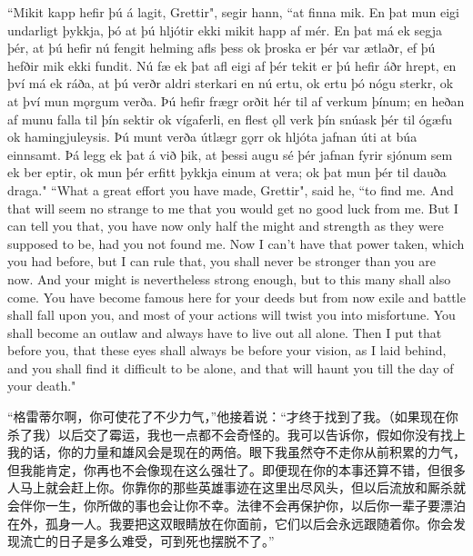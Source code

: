 \begin{paracol}{2}
  ``Mikit kapp hefir þú á lagit, Grettir", segir hann, ``at finna mik. En þat mun eigi undarligt þykkja, þó at þú hljótir ekki mikit happ af mér. En þat má ek segja þér, at þú hefir nú fengit helming afls þess ok þroska er þér var ætlaðr, ef þú hefðir mik ekki fundit. Nú fæ ek þat afl eigi af þér tekit er þú hefir áðr hrept, en því má ek ráða, at þú verðr aldri sterkari en nú ertu, ok ertu þó nógu sterkr, ok at því mun mǫrgum verða. Þú hefir frægr orðit hér til af verkum þínum; en heðan af munu falla til þín sektir ok vígaferli, en flest ǫll verk þín snúask þér til ógæfu ok hamingjuleysis. Þú munt verða útlægr gǫrr ok hljóta jafnan úti at búa einnsamt. Þá legg ek þat á við þik, at þessi augu sé þér jafnan fyrir sjónum sem ek ber eptir, ok mun þér erfitt þykkja einum at vera; ok þat mun þér til dauða draga."
  \switchcolumn
  ``What a great effort you have made, Grettir", said he, ``to find me. And that will seem no strange to me that you would get no good luck from me. But I can tell you that, you have now only half the might and strength as they were supposed to be, had you not found me. Now I can't have that power taken, which you had before, but I can rule that, you shall never be stronger than you are now. And your might is nevertheless strong enough, but to this many shall also come. You have become famous here for your deeds but from now exile and battle shall fall upon you, and most of your actions will twist you into misfortune. You shall become an outlaw and always have to live out all alone. Then I put that before you, that these eyes shall always be before your vision, as I laid behind, and you shall find it difficult to be alone, and that will haunt you till the day of your death."
\end{paracol}
\begin{translation*}{}
  “格雷蒂尔啊，你可使花了不少力气，”他接着说：“才终于找到了我。（如果现在你杀了我）以后交了霉运，我也一点都不会奇怪的。我可以告诉你，假如你没有找上我的话，你的力量和雄风会是现在的两倍。眼下我虽然夺不走你从前积累的力气，但我能肯定，你再也不会像现在这么强壮了。即便现在你的本事还算不错，但很多人马上就会赶上你。你靠你的那些英雄事迹在这里出尽风头，但以后流放和厮杀就会伴你一生，你所做的事也会让你不幸。法律不会再保护你，以后你一辈子要漂泊在外，孤身一人。我要把这双眼睛放在你面前，它们以后会永远跟随着你。你会发现流亡的日子是多么难受，可到死也摆脱不了。”
\end{translation*}
